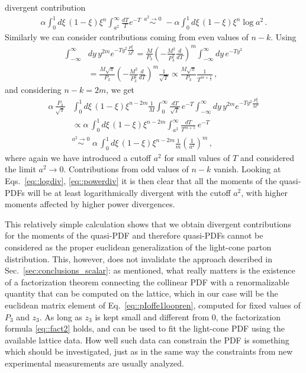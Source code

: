 divergent contribution
\begin{align}
\label{eq::logdiv}
	\alpha\int_0^1 d\xi\, 
	\left(1-\xi\right) \xi^n \int_{a^2}^{\infty} \frac{dT}{T}e^{-T}\,\,
	\stackrel{a^2\rightarrow 0}{\sim}\,\, 
	- \alpha\int_0^1 d\xi\, \left(1-\xi\right) \xi^n \log a^2\, .
\end{align}
Similarly we can consider contributions coming from even values of $n-k$. Using 
\begin{align}
	\int_{-\infty}^{\infty}
	&dy\, y^{2m} e^{-T y^2 \frac{P_3^2}{M^2}} = 
		\frac{M}{P_3} \left(-\frac{M^2}{P_3^2}\frac{d}{dT}\right)^m 
		\int_{-\infty}^{\infty} dy\,e^{-T y^2} \nonumber \\
	&= \frac{M\sqrt{\pi}}{P_3} 
	\left(-\frac{M^2}{P_3^2}\frac{d}{dT}\right)^m \frac{1}{\sqrt{T}}  
	\propto \frac{M \sqrt{\pi}}{P_3} \frac{1}{T^{m + \frac{1}{2}}}\, ,
\end{align}
and considering $n-k = 2m$, we get
\begin{align}
	\label{eq::powerdiv}
	\alpha\, \frac{P_3}{\sqrt{\pi}}
	&\int_0^1 d\xi\, \left(1-\xi\right) \xi^{n-2m} \frac{1}{M}
		\int_0^{\infty} \frac{dT}{\sqrt{T}}\, e^{-T } 
		\int_{-\infty}^{\infty} dy\, y^{2m} e^{-T y^2 \frac{P_3^2}{M^2}} \nonumber \\
	&\propto \alpha\, \int_0^1 d\xi\, \left(1-\xi\right) \xi^{n-2m}
		\int_{a^2}^{\infty} \frac{dT}{T^{m +1}}\, e^{-T} \,\, \nonumber \\
		&\stackrel{a^2\rightarrow 0}{\sim}\,\, 
		\alpha\, \int_0^1 d\xi\, \left(1-\xi\right) \xi^{n-2m}
		\frac{1}{m} \left(\frac{1}{a^2} \right)^{m}\, ,
\end{align}
where again we have introduced a cutoff $a^2$ for small values of $T$ and
considered the limit $a^2 \rightarrow 0$. Contributions from odd values of $n-k$
vanish. Looking at Eqs.~\eqref{eq::logdiv}, \eqref{eq::powerdiv} it is then
clear that all the moments of the quasi-PDFs will be at least logarithmically
divergent with the cutoff $a^2$, with higher moments affected by higher power
divergences.

This relatively simple calculation shows that we obtain divergent contributions
for the moments of the quasi-PDF and therefore quasi-PDFs cannot be considered
as the proper euclidean generalization of the light-cone parton distribution.
This, however, does not invalidate the approach described in
Sec.~\ref{sec:conclusions_scalar}: as mentioned, what really matters is the existence
of a factorization theorem connecting the collinear PDF with a renormalizable
quantity that can be computed on the lattice, which in our case will be the
euclidean matrix element of Eq.~\eqref{eq::pIoffe1loopren}, computed for fixed
values of $P_3$ and $z_3$. As long as $z_3$ is kept small and different from
$0$, the factorization formula \eqref{eq::fact2} holds, and can be used to fit
the light-cone PDF using the available lattice data. How well such data can
constrain the PDF is something which should be investigated, just as in the same
way the constraints from new experimental measurements are usually analyzed.